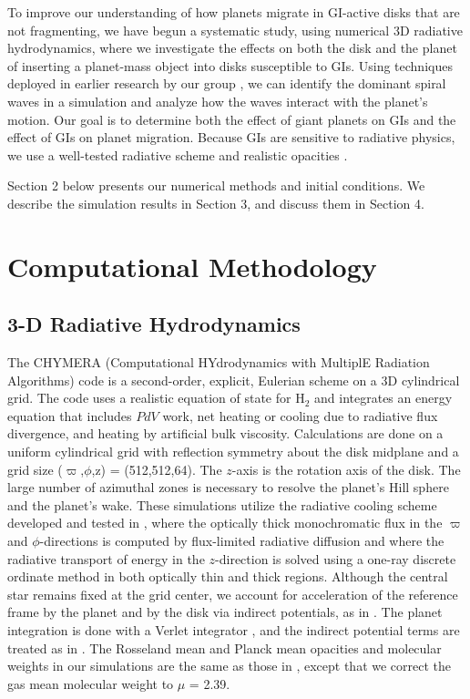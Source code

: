 \documentclass[12pt,manuscript,authoryear]{aastex}
\begin{document}
To improve our understanding of how planets migrate in GI-active disks that are not fragmenting, we have begun a systematic study, using numerical 3D radiative hydrodynamics, where we investigate the effects on both the disk and the planet of inserting a planet-mass object into disks susceptible to GIs. Using techniques deployed in earlier research by our group \citep{pickett2003, mejia2005,cai2006,cai2008,boley2006,boley2007b,michael2010}, we can identify the dominant spiral waves in a simulation and analyze how the waves interact with the planet's motion. Our goal is to determine both the effect of giant planets on GIs and the effect of GIs on planet migration. Because GIs are sensitive to radiative physics, we use a well-tested radiative scheme \citep{boley2007b} and realistic opacities \citep{dalessio2001}. 

Section 2 below presents our numerical methods and initial conditions.  We describe the simulation results in Section 3, and discuss them in Section 4.  

\section{Computational Methodology}

\subsection{3-D Radiative Hydrodynamics}

The CHYMERA (Computational HYdrodynamics with MultiplE Radiation Algorithms) code \citep{boley2007b} is a second-order, explicit, Eulerian scheme on a 3D cylindrical grid. The code uses a realistic equation of state for H$_2$ \citep{boley2007} and integrates an energy equation that includes $PdV$ work, net heating or cooling due to radiative flux divergence, and heating by artificial bulk viscosity. Calculations are done on a uniform cylindrical grid with reflection symmetry about the disk midplane and a grid size ($\varpi$,$\phi$,z) = (512,512,64). 
The $z$-axis is the rotation axis of the disk. The large number of azimuthal zones is necessary to resolve the planet's Hill sphere and the planet's wake. These simulations utilize the radiative cooling scheme developed and tested in \citet{boley2007b}, where the optically thick monochromatic flux in the $\varpi$ and $\phi$-directions is computed by flux-limited radiative diffusion and where the radiative transport of energy in the $z$-direction is solved using a one-ray discrete ordinate method in both optically thin and thick regions. Although the central star remains fixed at the grid center, we account for acceleration of the reference frame by the planet and by the disk via indirect potentials, as in \citet{michael2010}. The planet integration is done with a Verlet integrator \citep[e.g.,][]{hut1995}, and the indirect potential terms are treated as in \citet{nelson2000a}. The Rosseland mean and Planck mean opacities and molecular weights in our simulations are the same as those in \citet{boley2006,boley2007b}, except that we correct the \citet{dalessio2001} gas mean molecular weight to $\mu$ = 2.39.
\end{document}

